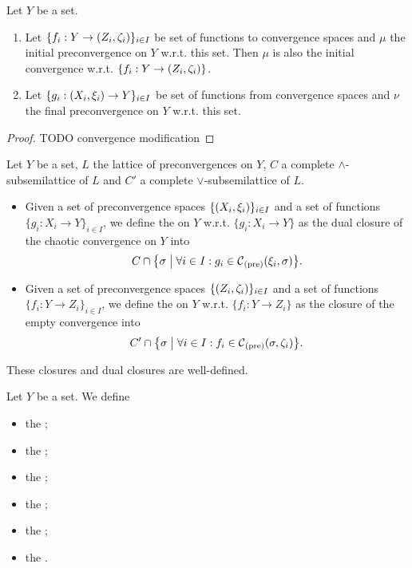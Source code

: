 \begin{proposition} \label{initialFinalConvergenceModification}
Let $Y$ be a set.
\begin{enumerate}
\item Let $\{f_i: Y\to \left( Z_i, \zeta_i \right)\}_{i\in I}$ be set of functions to convergence spaces and $\mu$ the initial preconvergence on $Y$ w.r.t. this set. Then $\mu$ is also the initial convergence w.r.t. $\{f_i: Y\to \left( Z_i, \zeta_i \right)\}$.
\item Let $\{g_i: \left( X_i, \xi_i \right) \to Y\}_{i\in I}$ be set of functions from convergence spaces and $\nu$ the final preconvergence on $Y$ w.r.t. this set. 
\end{enumerate}
\end{proposition}
\begin{proof}
TODO convergence modification
\end{proof}

\begin{definition}
Let $Y$ be a set, $L$ the lattice of preconvergences on $Y$, $C$ a complete $\wedge$-subsemilattice of $L$ and $C'$ a complete $\vee$-subsemilattice of $L$.
\begin{itemize}
\item Given a set of preconvergence spaces $\{\left( X_i,\xi_i \right)\}_{i\in I}$ and a set of functions $\{g_i: X_i \to Y\}_{i\in I}$, we define the  on $Y$ w.r.t. $\{g_i: X_i\to Y\}$ as the dual closure of the chaotic convergence on $Y$ into
\[ C \cap \setbuilder{\sigma}{\forall i\in I: g_i\in  \cont_\text{(pre)}(\xi_i, \sigma)}. \]
\item Given a set of preconvergence spaces $\{\left( Z_i,\zeta_i \right)\}_{i\in I}$ and a set of functions $\{f_i: Y\to Z_i\}_{i\in I}$, we define the  on $Y$ w.r.t. $\{f_i: Y\to Z_i\}$ as the closure of the empty convergence into
\[ C'\cap \setbuilder{\sigma}{\forall i\in I: f_i\in  \cont_\text{(pre)}(\sigma, \zeta_i)}. \]
\end{itemize}
\end{definition}

\begin{lemma}
These closures and dual closures are well-defined.
\end{lemma}

\begin{definition}
Let $Y$ be a set. We define
\begin{itemize}
\item the ;
\item the ;
\item the ;
\item the ;
\item the ;
\item the .
\end{itemize}
\end{definition}

